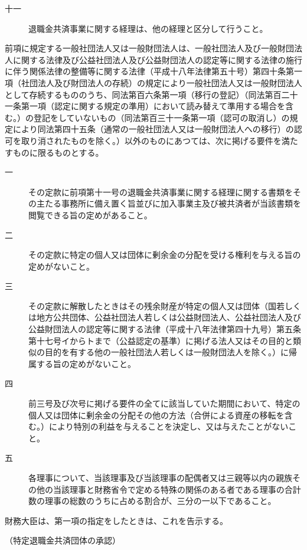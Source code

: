\documentclass[twocolumn,a4j,10pt]{ltjtarticle}
\begin{document}
\begin{description}
\begin{description}
\item[十一]退職金共済事業に関する経理は、他の経理と区分して行うこと。
\end{description}
\item[\rensuji{2}]前項に規定する一般社団法人又は一般財団法人は、一般社団法人及び一般財団法人に関する法律及び公益社団法人及び公益財団法人の認定等に関する法律の施行に伴う関係法律の整備等に関する法律（平成十八年法律第五十号）第四十条第一項（社団法人及び財団法人の存続）の規定により一般社団法人又は一般財団法人として存続するもののうち、同法第百六条第一項（移行の登記）（同法第百二十一条第一項（認定に関する規定の準用）において読み替えて準用する場合を含む。）の登記をしていないもの（同法第百三十一条第一項（認可の取消し）の規定により同法第四十五条（通常の一般社団法人又は一般財団法人への移行）の認可を取り消されたものを除く。）以外のものにあつては、次に掲げる要件を満たすものに限るものとする。
\begin{description}
\item[一]その定款に前項第十一号の退職金共済事業に関する経理に関する書類をその主たる事務所に備え置く旨並びに加入事業主及び被共済者が当該書類を閲覧できる旨の定めがあること。
\item[二]その定款に特定の個人又は団体に剰余金の分配を受ける権利を与える旨の定めがないこと。
\item[三]その定款に解散したときはその残余財産が特定の個人又は団体（国若しくは地方公共団体、公益社団法人若しくは公益財団法人、公益社団法人及び公益財団法人の認定等に関する法律（平成十八年法律第四十九号）第五条第十七号イからトまで（公益認定の基準）に掲げる法人又はその目的と類似の目的を有する他の一般社団法人若しくは一般財団法人を除く。）に帰属する旨の定めがないこと。
\item[四]前三号及び次号に掲げる要件の全てに該当していた期間において、特定の個人又は団体に剰余金の分配その他の方法（合併による資産の移転を含む。）により特別の利益を与えることを決定し、又は与えたことがないこと。
\item[五]各理事について、当該理事及び当該理事の配偶者又は三親等以内の親族その他の当該理事と財務省令で定める特殊の関係のある者である理事の合計数の理事の総数のうちに占める割合が、三分の一以下であること。
\end{description}
\item[\rensuji{3}]財務大臣は、第一項の指定をしたときは、これを告示する。
\end{description}
\noindent\hspace{10pt}（特定退職金共済団体の承認）
\end{document}
